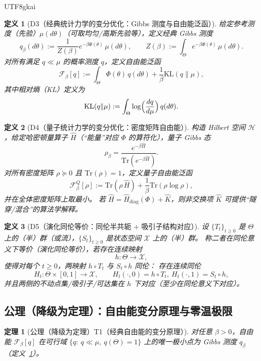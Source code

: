 \documentclass[12pt]{article}
\newtheorem{definition}{定义}[section]
\newtheorem{theorem}{定理}[section]
\begin{document}
\begin{CJK*}{UTF8}{gkai}
\begin{definition}[D3（经典统计力学的变分优化：Gibbs 测度与自由能泛函）]
\label{def:tex27-ch8-d3}
给定参考测度（先验）$\mu(d\theta)$（可取均匀/高斯先验等），定义经典 Gibbs 测度
\[
  q_\beta(d\theta)
  :=\frac{1}{Z(\beta)}e^{-\beta\Phi(\theta)}\,\mu(d\theta),
  \qquad
  Z(\beta):=\int_\Theta e^{-\beta\Phi(\theta)}\,\mu(d\theta).
\]
对所有满足 $q\ll\mu$ 的概率测度 $q$，定义自由能泛函
\[
  \mathcal{F}_\beta[q]
  :=\int_\Theta \Phi(\theta)\,q(d\theta)
  +\frac{1}{\beta}\mathrm{KL}(q\|\mu),
\]
其中相对熵（KL）定义为
\[
  \mathrm{KL}(q\|\mu):=\int_\Theta \log\Bigl(\frac{dq}{d\mu}\Bigr)\,q(d\theta).
\]
\end{definition}

\begin{definition}[D4（量子统计力学的变分优化：密度矩阵自由能）]
\label{def:tex27-ch8-d4}
构造 Hilbert 空间 $\mathcal{H}$，给定哈密顿量算子 $\widehat{H}$（“能量”对应 $\Phi$ 的算符化），量子 Gibbs 态
\[
  \rho_\beta=\frac{e^{-\beta \widehat{H}}}{\mathrm{Tr}(e^{-\beta \widehat{H}})}.
\]
对所有密度矩阵 $\rho\succeq 0$ 且 $\mathrm{Tr}(\rho)=1$，定义量子自由能泛函
\[
  \mathcal{F}^{Q}_\beta[\rho]
  :=\mathrm{Tr}(\rho\,\widehat{H})
  +\frac{1}{\beta}\mathrm{Tr}(\rho\log\rho),
\]
并在全体密度矩阵上取最小。
若 $\widehat{H}=\widehat{H}_{\mathrm{diag}}(\Phi)+\widehat{K}$，则非交换项 $\widehat{K}$ 可提供“隧穿/混合”的算法学解释。
\end{definition}

\begin{definition}[D5（演化同伦等价：同伦半共轭 + 吸引子结构对应）]
\label{def:tex27-ch8-d5}
设 $\{T_t\}_{t\ge 0}$ 是 $\Theta$ 上的（半）群（或流），$\{S_t\}_{t\ge 0}$ 是状态空间 $\mathcal{X}$ 上的（半）群。
称二者在同伦意义下等价（演化同伦等价），若存在连续映射
\[
  h:\Theta\to\mathcal{X},
\]
使得对每个 $t\ge 0$，两映射 $h\circ T_t$ 与 $S_t\circ h$ 同伦：
存在连续同伦
\[
  H_t:\Theta\times[0,1]\to\mathcal{X},
  \qquad
  H_t(\cdot,0)=h\circ T_t,\ H_t(\cdot,1)=S_t\circ h,
\]
并且两侧的不动点集/吸引子/可达集在 $h$ 下对应（至少在同伦意义下对应）。
\end{definition}

\subsection{公理（降级为定理）：自由能变分原理与零温极限}
\label{subsec:tex27-ch8-axioms}

\begin{theorem}[公理（降级为定理）T1（经典自由能的变分原理）]
\label{thm:tex27-ch8-t1}
对任意 $\beta>0$，自由能 $\mathcal{F}_\beta[q]$ 在可行域 $\{q:\ q\ll\mu,\ q(\Theta)=1\}$ 上的唯一极小点为 Gibbs 测度 $q_\beta$（定义~\ref{def:tex27-ch8-d3}）。
\end{theorem}


\end{CJK*}
\end{document}

